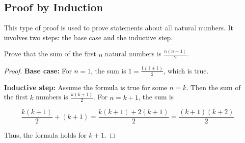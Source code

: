 \documentclass{article}
\theoremstyle{mytheoremstyle}
\theoremstyle{mytheoremstyle}
\theoremstyle{myexamplestyle}
\begin{document}
\subsection{Proof by Induction}

This type of proof is used to prove statements about all natural numbers. It involves two steps: the base case and the inductive step.

\begin{example}
    Prove that the sum of the first \( n \) natural numbers is
    \( \displaystyle\frac{n(n+1)}{2} \).

    \begin{proof}

        \textbf{Base case:} For \( n = 1 \), the sum is
        \(\displaystyle 1 = \frac{1(1+1)}{2} \), which is true.

        \textbf{Inductive step:} Assume the formula is true for some \( n = k \). Then the sum of the first \( k \) numbers is \( \frac{k(k+1)}{2} \). For \( n = k+1 \), the sum is

        \[\frac{k(k+1)}{2} + (k+1) = \frac{k(k+1) + 2(k+1)}{2} = \frac{(k+1)(k+2)}{2}\]

        Thus, the formula holds for \( k+1 \).
    \end{proof}
\end{example}
\end{document}
